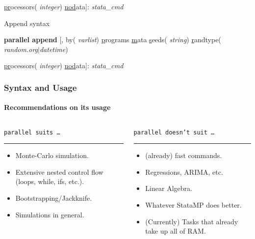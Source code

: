 \documentclass[9pt,\ExtraDocOpts]{beamer}
\begin{document}
\begin{frame}
\begin{semiverbatim}
	\hspace{1cm} \uline{pr}ocessors(\textit{\color{blue} integer}) \uline{nod}ata]:  \textit{stata\_cmd}
\end{semiverbatim}\pause{}


Append syntax

\begin{semiverbatim}
	\footnotesize
	{\bf parallel append} [, by(\textit{\color{blue} varlist}) \uline{p}rograms \uline{m}ata \uline{s}eeds(\textit{\color{blue} string}) \uline{r}andtype(\textit{\color{blue} random.org$|$datetime})
	
	\hspace{1cm} \uline{pr}ocessors(\textit{\color{blue} integer}) \uline{nod}ata]:  \textit{stata\_cmd}
\end{semiverbatim}


\end{frame}


\begin{frame}
\frametitle{Syntax and Usage}
\framesubtitle{Recommendations on its usage}

\begin{columns}
\begin{column}{.5\textwidth}
{\color{gray}
{\tt parallel suits \ldots}
\rule{\linewidth}{4pt}}
\begin{itemize}
\item Monte-Carlo simulation.\pause{}
\item Extensive nested control flow (loops, while, ifs, etc.).\pause{}
\item Bootstrapping/Jackknife.\pause{}
\item Simulations in general.\pause{}
\end{itemize}
\end{column}%
\hfill%
\begin{column}{.5\textwidth}
{\color{gray}
{\tt parallel doesn't suit \ldots}
\rule{\linewidth}{4pt}}
\begin{itemize}
\item (already) fast commands.\pause{}
\item Regressions, ARIMA, etc.\pause{}
\item Linear Algebra.\pause{}
\item Whatever StataMP does better.\pause{}
\item (Currently) Tasks that already take up all of RAM.
\end{itemize}
\end{column}%
\end{columns}
\end{frame}
\end{document}
